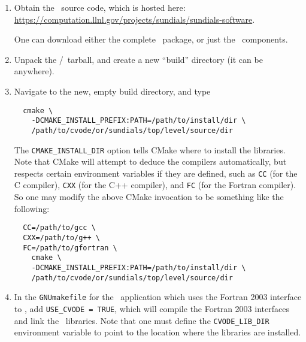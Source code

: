 \begin{enumerate}

  \item Obtain the \cvode\ source code, which is hosted here: \url{https://computation.llnl.gov/projects/sundials/sundials-software}.

  One can download either the complete \sundials\ package, or just the \cvode\ components.

  \item Unpack the \cvode/\sundials\ tarball, and create a new ``build'' directory (it can be anywhere).

  \item Navigate to the new, empty build directory, and type

  \begin{verbatim}
  cmake \
    -DCMAKE_INSTALL_PREFIX:PATH=/path/to/install/dir \
    /path/to/cvode/or/sundials/top/level/source/dir
  \end{verbatim}

  The \texttt{CMAKE\_INSTALL\_DIR} option tells CMake where to install the libraries.
  Note that CMake will attempt to deduce the compilers automatically, but respects certain environment variables if they are defined, such as \texttt{CC} (for the C compiler), \texttt{CXX} (for the C++ compiler), and \texttt{FC} (for the Fortran compiler).
  So one may modify the above CMake invocation to be something like the following:

  \begin{verbatim}
  CC=/path/to/gcc \
  CXX=/path/to/g++ \
  FC=/path/to/gfortran \
    cmake \
    -DCMAKE_INSTALL_PREFIX:PATH=/path/to/install/dir \
    /path/to/cvode/or/sundials/top/level/source/dir
  \end{verbatim}

  \item In the \texttt{GNUmakefile} for the \amrex\ application which uses the Fortran 2003 interface to \cvode, add \texttt{USE\_CVODE = TRUE}, which will compile the Fortran 2003 interfaces and link the \cvode\ libraries.
  Note that one must define the \texttt{CVODE\_LIB\_DIR} environment variable to point to the location where the libraries are installed.
\end{enumerate}
